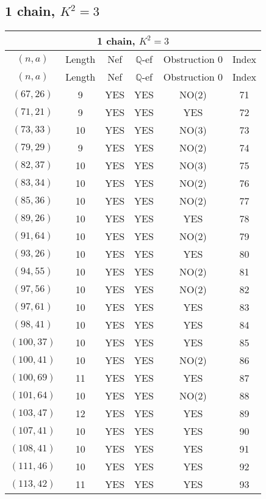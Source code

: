\subsection{1 chain, $K^2 = 3$}
\begin{longtable}{|c|c|c|c|c|c|}
\hline
\multicolumn{6}{|c|}{1 chain, $K^2 = 3$}\\
\hline
$(n,a)$ & Length & Nef & $\mathbb Q$-ef & Obstruction 0 & Index\\
\hline
\endfirsthead

\hline
$(n,a)$ & Length & Nef & $\mathbb Q$-ef & Obstruction 0 & Index\\
\hline
\endhead
\hline
\endfoot

$(67, 26)$ & 9 & YES & YES & NO(2) & 71\\
$(71, 21)$ & 9 & YES & YES & YES & 72\\
$(73, 33)$ & 10 & YES & YES & NO(3) & 73\\
$(79, 29)$ & 9 & YES & YES & NO(2) & 74\\
$(82, 37)$ & 10 & YES & YES & NO(3) & 75\\
$(83, 34)$ & 10 & YES & YES & NO(2) & 76\\
$(85, 36)$ & 10 & YES & YES & NO(2) & 77\\
$(89, 26)$ & 10 & YES & YES & YES & 78\\
$(91, 64)$ & 10 & YES & YES & NO(2) & 79\\
$(93, 26)$ & 10 & YES & YES & YES & 80\\
$(94, 55)$ & 10 & YES & YES & NO(2) & 81\\
$(97, 56)$ & 10 & YES & YES & NO(2) & 82\\
$(97, 61)$ & 10 & YES & YES & YES & 83\\
$(98, 41)$ & 10 & YES & YES & YES & 84\\
$(100, 37)$ & 10 & YES & YES & YES & 85\\
$(100, 41)$ & 10 & YES & YES & NO(2) & 86\\
$(100, 69)$ & 11 & YES & YES & YES & 87\\
$(101, 64)$ & 10 & YES & YES & NO(2) & 88\\
$(103, 47)$ & 12 & YES & YES & YES & 89\\
$(107, 41)$ & 10 & YES & YES & YES & 90\\
$(108, 41)$ & 10 & YES & YES & YES & 91\\
$(111, 46)$ & 10 & YES & YES & YES & 92\\
$(113, 42)$ & 11 & YES & YES & YES & 93\\

\end{longtable}
